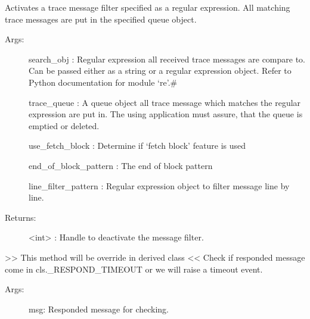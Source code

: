 \documentclass[letterpaper,10pt,english]{sphinxmanual}
\begin{document}
\begin{fulllineitems}
\begin{fulllineitems}
\label{\detokenize{QConnectionLibrary:QConnectionLibrary.connection_base.ConnectionBase.activate_trace_queue}}
\sphinxAtStartPar
Activates a trace message filter specified as a regular expression. All matching trace messages are put in the specified queue object.
\begin{description}
\item[{Args:}] \leavevmode
\sphinxAtStartPar
search\_obj :  Regular expression all received trace messages are compare to.                        Can be passed either as a string or a regular expression object. Refer to Python documentation for module ‘re’.\#

\sphinxAtStartPar
trace\_queue : A queue object all trace message which matches the regular expression are put in.                        The using application must assure, that the queue is emptied or deleted.

\sphinxAtStartPar
use\_fetch\_block : Determine if ‘fetch block’ feature is used

\sphinxAtStartPar
end\_of\_block\_pattern : The end of block pattern

\sphinxAtStartPar
line\_filter\_pattern : Regular expression object to filter message line by line.

\item[{Returns:}] \leavevmode
\sphinxAtStartPar
\textless{}int\textgreater{} : Handle to deactivate the message filter.

\end{description}

\end{fulllineitems}


\begin{fulllineitems}
\label{\detokenize{QConnectionLibrary:QConnectionLibrary.connection_base.ConnectionBase.check_timeout}}
\sphinxAtStartPar
\textgreater{}\textgreater{} This method will be override in derived class \textless{}\textless{}
Check if responded message come in cls.\_RESPOND\_TIMEOUT or we will raise a timeout event.
\begin{description}
\item[{Args:}] \leavevmode
\sphinxAtStartPar
msg: Responded message for checking.


\end{description}
\end{fulllineitems}
\end{fulllineitems}
\end{document}
